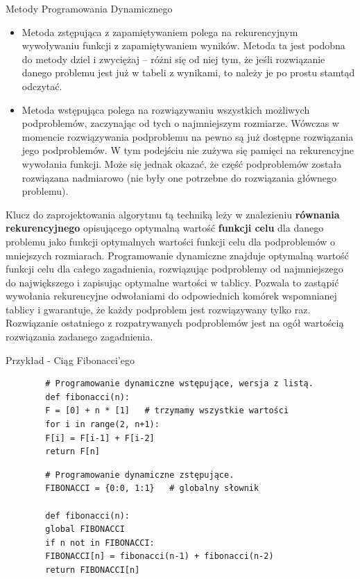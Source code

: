 \documentclass[12pt]{article}
\begin{document}
    Metody Programowania Dynamicznego
    \begin{itemize}
        \item Metoda zstępująca z zapamiętywaniem polega na rekurencyjnym wywoływaniu funkcji z zapamiętywaniem wyników. Metoda ta jest podobna do metody dziel i zwyciężaj – różni się od niej tym, że jeśli rozwiązanie danego problemu jest już w tabeli z wynikami, to należy je po prostu stamtąd odczytać.
        \item Metoda wstępująca polega na rozwiązywaniu wszystkich możliwych podproblemów, zaczynając od tych o najmniejszym rozmiarze. Wówczas w momencie rozwiązywania podproblemu na pewno są już dostępne rozwiązania jego podproblemów. W tym podejściu nie zużywa się pamięci na rekurencyjne wywołania funkcji. Może się jednak okazać, że część podproblemów została rozwiązana nadmiarowo (nie były one potrzebne do rozwiązania głównego problemu).
    \end{itemize}

    Klucz do zaprojektowania algorytmu tą techniką leży w znalezieniu \textbf{równania rekurencyjnego} opisującego optymalną wartość \textbf{funkcji celu} dla danego problemu jako funkcji optymalnych wartości funkcji celu dla podproblemów o mniejszych rozmiarach. Programowanie dynamiczne znajduje optymalną wartość funkcji celu dla całego zagadnienia, rozwiązując podproblemy od najmniejszego do największego i zapisując optymalne wartości w tablicy. Pozwala to zastąpić wywołania rekurencyjne odwołaniami do odpowiednich komórek wspomnianej tablicy i gwarantuje, że każdy podproblem jest rozwiązywany tylko raz. Rozwiązanie ostatniego z rozpatrywanych podproblemów jest na ogół wartością rozwiązania zadanego zagadnienia.

    Przykład - Ciąg Fibonacci'ego

    \begin{verbatim}
        # Programowanie dynamiczne wstępujące, wersja z listą.
        def fibonacci(n):
        F = [0] + n * [1]   # trzymamy wszystkie wartości
        for i in range(2, n+1):
        F[i] = F[i-1] + F[i-2]
        return F[n]
    \end{verbatim}

    \begin{verbatim}
        # Programowanie dynamiczne zstępujące.
        FIBONACCI = {0:0, 1:1}   # globalny słownik

        def fibonacci(n):
        global FIBONACCI
        if n not in FIBONACCI:
        FIBONACCI[n] = fibonacci(n-1) + fibonacci(n-2)
        return FIBONACCI[n]
    \end{verbatim}
\end{document}

